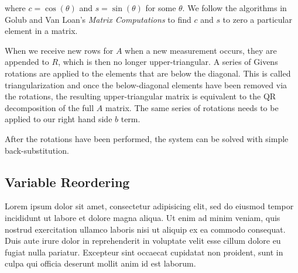 \documentclass[conference]{IEEEtran}
\begin{document}
where $c = \cos{(\theta)}$ and $s = \sin{(\theta)}$ for some $\theta$. We follow the
  algorithms in Golub and Van Loan's \emph{Matrix Computations} to find $c$ and $s$ to
  zero a particular element in a matrix. \cite{golub1996matrix} 

When we receive new rows for $A$ when a new measurement occurs, they are appended to $R$,
which is then no longer upper-triangular. A series of Givens rotations are applied to the
elements that are below the diagonal. This is called triangularization and once the
below-diagonal elements have been removed via the rotations, the resulting
upper-triangular matrix is equivalent to the QR decomposition of the full $A$ matrix.
\cite{golub1996matrix} The same series of rotations needs to be applied to our right hand
side $b$ term.

After the rotations have been performed, the system can be solved with simple back-substitution.


\subsection*{Variable Reordering}
\label{sub:variablereordering}

Lorem ipsum dolor sit amet, consectetur adipisicing elit, sed do eiusmod tempor incididunt
ut labore et dolore magna aliqua. Ut enim ad minim veniam, quis nostrud exercitation
ullamco laboris nisi ut aliquip ex ea commodo consequat. Duis aute irure dolor in
reprehenderit in voluptate velit esse cillum dolore eu fugiat nulla pariatur. Excepteur
sint occaecat cupidatat non proident, sunt in culpa qui officia deserunt mollit anim id
est laborum.
\end{document}
